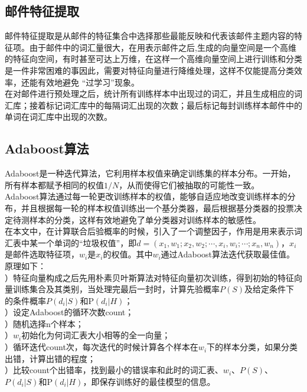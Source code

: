 \documentclass[a4paper,11pt,onecolumn,twoside]{article}
\begin{document}
\begin{multicols}{2}
\subsection{邮件特征提取}
邮件特征提取是从邮件的特征集合中选择那些最能反映和代表该邮件主题内容的特征项。由于邮件中的词汇量很大，在用表示邮件之后,生成的向量空间是一个高维的特征向空间，有时甚至可达上万维，在这样一个高维向量空间上进行训练和分类是一件非常困难的事因此，需要对特征向量进行降维处理，这样不仅能提高分类效率，还能有效地避免 “过学习”现象。\\
\indent 在对邮件进行预处理之后，统计所有训练样本中出现过的词汇，并且生成相应的词汇库；接着标记词汇库中的每隔词汇出现的次数；最后标记每封训练样本邮件中的单词在词汇库中出现的次数。
\subsection{Adaboost算法}
Adaboost是一种迭代算法，它利用样本权值来确定训练集的样本分布。一开始，所有样本都赋予相同的权值$1/N$，从而使得它们被抽取的可能性一致\cite{Chen}。\\
\indent Adaboost算法通过每一轮更改训练样本的权值，能够自适应地改变训练样本的分布，并且根据每一轮的样本权值训练出一个基分类器，最后根据基分类器的投票决定待测样本的分类，这样有效地避免了单分类器对训练样本的敏感性。\\
\indent 在本文中，在计算联合后验概率的时候，引入了一个调整因子，作用是用来表示词汇表中某一个单词的“垃圾权值”，即$d=(x_1,w_1;x_2,w_2;\cdots,x_i,w_i;\cdots;x_n,w_n)$，$x_i$是邮件选取特征项，$w_i$是$x_i$的权值。其中$w_i$通过Adaboost算法迭代获取最佳值。原理如下：\\
）特征向量构成之后先用朴素贝叶斯算法对特征向量初次训练，得到初始的特征向量训练集合及其类别，当处理完最后一封时，计算先验概率$P(S)$及给定条件下的条件概率$P(d_i|S)$和P$(d_i|H)$；\\
）设定Adaboost的循环次数count；\\
）随机选择n个样本；\\
）$w_i$初始化为何词汇表大小相等的全一向量；\\
）循环迭代count次，每次迭代的时候计算各个样本在$w_i$下的样本分类，如果分类出错，计算出错的程度；\\
）比较count个出错率，找到最小的错误率和此时的词汇表、$w_i$、$P(S)$、$P(d_i|S)$和P$(d_i|H)$，即保存训练好的最佳模型的信息。\\

\end{multicols}
\end{document}
